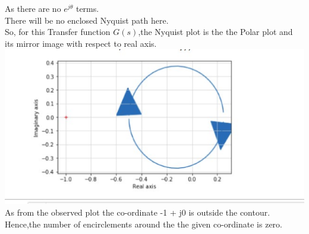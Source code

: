 \begin{enumerate}[label=\thesection.\arabic*.,ref=\thesection.\theenumi]
As there are no $e^{j\theta}$ terms.\\
There will be no enclosed Nyquist path here.\\ 
So, for this Transfer function $G(s)$,the Nyquist plot is the the Polar plot and its mirror image with respect to real axis.\\
\includegraphics[width=\columnwidth]{./figs/pythonnyquistplot.eps}\\
As from the observed plot the co-ordinate -1 + j0 is outside the contour.\\
Hence,the number of encirclements around the the given co-ordinate is zero.
\end{enumerate}
